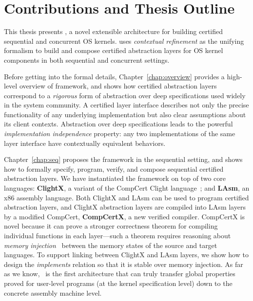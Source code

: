 \section{Contributions and Thesis Outline}
\label{sec:intro:contribution}

This thesis presents \CTOS{}, a novel extensible architecture
for building certified sequential and concurrent OS kernels.
\CTOS{} uses {\em contextual
    refinement} as the unifying formalism to build and
    compose certified abstraction layers for OS kernel components
in both sequential and concurrent settings. 

Before getting into the formal details,
Chapter~\ref{chap:overview}
provides a high-level overview of
\CTOS{} framework,
and  shows how 
certified
  abstraction layers  correspond to a {\em rigorous} 
  form of abstraction over deep specifications used widely
  in the system community. A certified layer interface
  describes not only the precise functionality of any underlying
  implementation but also clear assumptions about its client contexts.
  Abstraction over deep specifications leads to the powerful
  {\em implementation independence} property: 
  any two implementations
  of the same layer interface have contextually equivalent behaviors.
  
Chapter~\ref{chap:seq} proposes 
the \CTOS{} framework in the sequential setting,
and shows how to formally specify,
program, verify, and compose sequential certified abstraction layers. 
We have instantiated the framework on top of two core
  languages: {\bf
    ClightX}, a variant of the CompCert Clight
  language~\cite{blazy-leroy-clight}; and {\bf LAsm}, an x86 assembly
  language.  Both ClightX and LAsm can be used to program certified
  abstraction layers,
  and ClightX abstraction layers are compiled into 
  LAsm layers by a modified CompCert,
  {\bf CompCertX}, a new verified compiler.
    CompCertX is novel because it can prove a stronger
  correctness theorem for compiling individual functions in each
  layer---such a theorem requires reasoning about {\em memory
    injection}~\cite{leroy08} between the memory states of the source
  and target languages.  To support linking between ClightX and LAsm
  layers, we show how to design the {\em implements} relation so that it
  is stable over memory injection.
    As far as we
  know, \CTOS\ is the first architecture that can truly transfer
  global properties proved for user-level programs (at the kernel
  specification level) down to the concrete assembly machine level.
  
